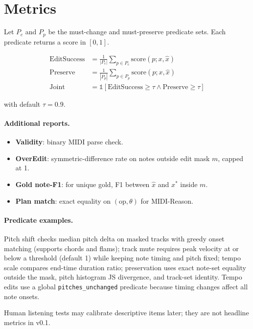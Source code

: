 \section{Metrics}

Let $P_c$ and $P_p$ be the must-change and must-preserve predicate sets. Each predicate returns a score in $[0,1]$.

\begin{align}
\text{EditSuccess} &= \frac{1}{|P_c|}\sum_{p \in P_c} \text{score}(p; x, \hat{x}) \\
\text{Preserve} &= \frac{1}{|P_p|}\sum_{p \in P_p} \text{score}(p; x, \hat{x}) \\
\text{Joint} &= \mathbb{1}[\text{EditSuccess} \ge \tau \land \text{Preserve} \ge \tau]
\end{align}

with default $\tau = 0.9$.

\paragraph{Additional reports.}
\begin{itemize}[leftmargin=*]
\item \textbf{Validity}: binary MIDI parse check.
\item \textbf{OverEdit}: symmetric-difference rate on notes outside edit mask $m$, capped at 1.
\item \textbf{Gold note-F1}: for unique gold, F1 between $\hat{x}$ and $x^{*}$ inside $m$.
\item \textbf{Plan match}: exact equality on $(\text{op}, \theta)$ for MIDI-Reason.
\end{itemize}

\paragraph{Predicate examples.}
Pitch shift checks median pitch delta on masked tracks with greedy onset matching (supports chords and flams); track mute requires peak velocity at or below a threshold (default 1) while keeping note timing and pitch fixed; tempo scale compares end-time duration ratio; preservation uses exact note-set equality outside the mask, pitch histogram JS divergence, and track-set identity. Tempo edits use a global \texttt{pitches\_unchanged} predicate because timing changes affect all note onsets.

Human listening tests may calibrate descriptive items later; they are not headline metrics in v0.1.
